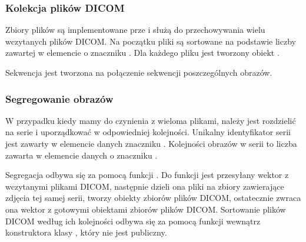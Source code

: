 \subsubsection{Kolekcja plików DICOM}
\label{sec:sokar-dicomfileset}
\par
Zbiory plików są implementowane prze  i służą do przechowywania wielu wczytanych plików DICOM.
Na początku pliki są sortowane na podstawie liczby zawartej w elemencie o znaczniku .
Dla każdego pliku jest tworzony obiekt .
\par
Sekwencja jest tworzona na połączenie sekwencji poszczególnych obrazów.

\subsubsection{Segregowanie obrazów}
\label{sec:sokar-dicomfileset-create}
\par
W przypadku kiedy mamy do czynienia z wieloma plikami, należy jest rozdzielić na serie i uporządkować w odpowiedniej kolejności.
Unikalny identyfikator serii jest zawarty w elemencie danych znaczniku .
Kolejności obrazów w serii to liczba zawarta w elemencie danych o znaczniku .
\par
Segregacja odbywa się za pomocą funkcji .
Do funkcji jest przesyłany wektor z wczytanymi plikami DICOM, następnie dzieli ona pliki na zbiory zawierające zdjęcia tej samej serii, tworzy obiekty zbiorów plików DICOM, ostatecznie zwraca ona wektor z gotowymi obiektami zbiorów plików DICOM.
Sortowanie plików DICOM według ich kolejności odbywa się za pomocą funkcji  wewnątrz konstruktora klasy , który nie jest publiczny.
